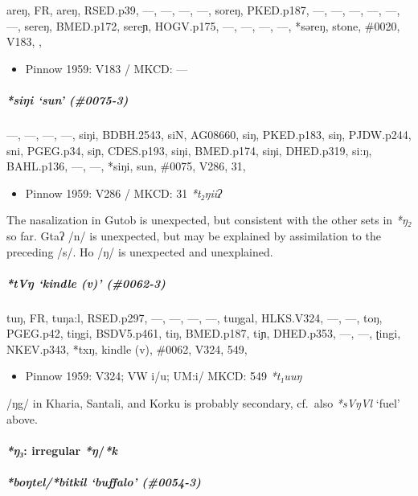 \documentclass[a4paper,]{article}
\providecommand{\tightlist}{%
  \setlength{\itemsep}{0pt}\setlength{\parskip}{0pt}}
\let\oldparagraph\paragraph
\renewcommand{\paragraph}[1]{\oldparagraph{#1}\mbox{}}
\let\oldsubparagraph\subparagraph
\renewcommand{\subparagraph}[1]{\oldsubparagraph{#1}\mbox{}}
\begin{document}
areŋ, FR, areŋ, RSED.p39, ---, ---, ---, ---, soreŋ, PKED.p187, ---,
---, ---, ---, ---, ---, sereŋ, BMED.p172, sereɲ, HOGV.p175, ---, ---,
---, ---, *səreŋ, stone, \#0020, V183, ,

\begin{itemize}
\tightlist
\item
  Pinnow 1959: V183 / MKCD: ---
\end{itemize}

\subparagraph{\texorpdfstring{\emph{*siŋi} `sun'
(\#0075-3)}{*siŋi sun (\#0075-3)}}\label{siux14bi-sun-0075-3}

---, ---, ---, ---, siŋi, BDBH.2543, siN, AG08660, siŋ, PKED.p183, siŋ,
PJDW.p244, sni, PGEG.p34, siɲ, CDES.p193, siŋi, BMED.p174, siŋi,
DHED.p319, si:ŋ, BAHL.p136, ---, ---, *siŋi, sun, \#0075, V286, 31,

\begin{itemize}
\tightlist
\item
  Pinnow 1959: V286 / MKCD: 31 \emph{*t₂ŋiiʔ}
\end{itemize}

The nasalization in Gutob is unexpected, but consistent with the other
sets in \emph{*ŋ₂} so far. Gtaʔ /n/ is unexpected, but may be explained
by assimilation to the preceding /s/. Ho /ŋ/ is unexpected and
unexplained.

\subparagraph{\texorpdfstring{\emph{*tVŋ} `kindle (v)'
(\#0062-3)}{*tVŋ kindle (v) (\#0062-3)}}\label{tvux14b-kindle-v-0062-3}

tuŋ, FR, tuŋa:l, RSED.p297, ---, ---, ---, ---, tuŋgal, HLKS.V324, ---,
---, toŋ, PGEG.p42, tiŋgi, BSDV5.p461, tiŋ, BMED.p187, tiɲ, DHED.p353,
---, ---, ʈingi, NKEV.p343, *txŋ, kindle (v), \#0062, V324, 549,

\begin{itemize}
\tightlist
\item
  Pinnow 1959: V324; VW i/u; UM:i/ MKCD: 549 \emph{*t₁uuŋ}
\end{itemize}

/ŋg/ in Kharia, Santali, and Korku is probably secondary, cf.~also
\emph{*sVŋVl} `fuel' above.

\paragraph{\texorpdfstring{\emph{*ŋ₃}: irregular
\emph{*ŋ}/\emph{*k}}{*ŋ₃: irregular *ŋ/*k}}\label{ux14b-irregular-ux14bk}

\subparagraph{\texorpdfstring{\emph{*boŋtel}/\emph{*bitkil} `buffalo'
(\#0054-3)}{*boŋtel/*bitkil buffalo (\#0054-3)}}\label{boux14btelbitkil-buffalo-0054-3}
\end{document}
